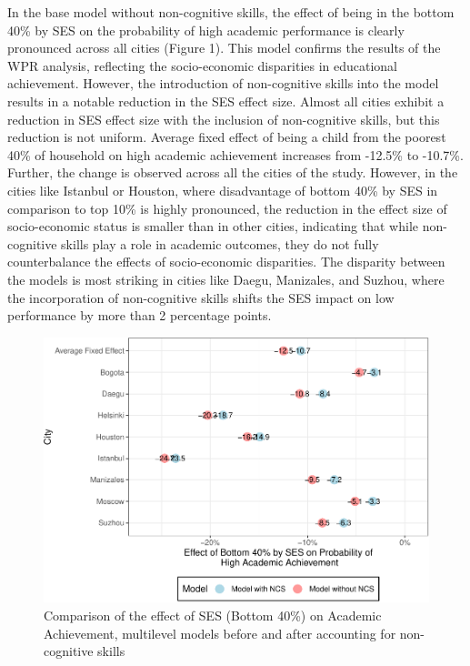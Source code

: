 \documentclass[
  12pt,
  a4paper,
]{article}
\begin{document}
In the base model without non-cognitive skills, the effect of being in
the bottom 40\% by SES on the probability of high academic performance
is clearly pronounced across all cities (Figure 1). This model confirms
the results of the WPR analysis, reflecting the socio-economic
disparities in educational achievement. However, the introduction of
non-cognitive skills into the model results in a notable reduction in
the SES effect size. Almost all cities exhibit a reduction in SES effect
size with the inclusion of non-cognitive skills, but this reduction is
not uniform. Average fixed effect of being a child from the poorest 40\%
of household on high academic achievement increases from -12.5\% to
-10.7\%. Further, the change is observed across all the cities of the
study. However, in the cities like Istanbul or Houston, where
disadvantage of bottom 40\% by SES in comparison to top 10\% is highly
pronounced, the reduction in the effect size of socio-economic status is
smaller than in other cities, indicating that while non-cognitive skills
play a role in academic outcomes, they do not fully counterbalance the
effects of socio-economic disparities. The disparity between the models
is most striking in cities like Daegu, Manizales, and Suzhou, where the
incorporation of non-cognitive skills shifts the SES impact on low
performance by more than 2 percentage points.

\begin{figure}
\centering
\includegraphics{ncs_and_academic_achievementRmd_files/figure-latex/reduce the gap-1.pdf}
\caption{Comparison of the effect of SES (Bottom 40\%) on Academic
Achievement, multilevel models before and after accounting for
non-cognitive skills}
\end{figure}
\end{document}

